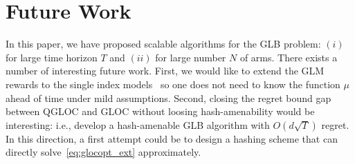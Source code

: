\vspace{-4pt}
\section{Future Work}
\label{sec:conclusion}
\vspace{-4pt}

In this paper, we have proposed scalable algorithms for the GLB problem: $(i)$ for large time horizon $T$ and $(ii)$ for large number $N$ of arms.
There exists a number of interesting future work.
First, we would like to extend the GLM rewards to the single index models~\cite{kalai09theisotron} so one does not need to know the function $\mu$ ahead of time under mild assumptions.
Second, closing the regret bound gap between QGLOC and GLOC without loosing hash-amenability would be interesting: i.e., develop a hash-amenable GLB algorithm with $O(d\sqrt{T})$ regret.
In this direction, a first attempt could be to design a hashing scheme that can directly solve~\eqref{eq:glocopt_ext} approximately.


